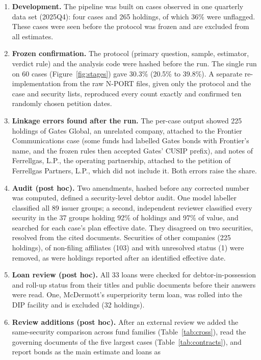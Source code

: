 \documentclass[11pt]{article}
\begin{document}
\begin{enumerate}
\item \textbf{Development.} The pipeline was built on cases observed in one quarterly data set (2025Q4):
four cases and 265 holdings, of which 36\% were unflagged. These cases were seen before the protocol was
frozen and are excluded from all estimates.
\item \textbf{Frozen confirmation.} The protocol (primary question, sample, estimator, verdict rule) and
the analysis code were hashed before the run. The single run on 60 cases (Figure~\ref{fig:stages}) gave 30.3\% (20.5\% to
39.8\%). A separate re-implementation from the raw N-PORT files, given only the protocol and the case and
security lists, reproduced every count exactly and confirmed ten randomly chosen petition dates.
\item \textbf{Linkage errors found after the run.} The per-case output showed 225 holdings of Gates
Global, an unrelated company, attached to the Frontier Communications case (some funds had labelled
Gates bonds with Frontier's name, and the frozen rules then accepted Gates' CUSIP prefix), and notes of
Ferrellgas, L.P., the operating partnership, attached to the petition of Ferrellgas Partners, L.P., which
did not include it. Both errors raise the share.
\item \textbf{Audit (post hoc).} Two amendments, hashed before any corrected number was computed, defined
a security-level debtor audit. One model labeller classified all 89 issuer groups; a second, independent
reviewer classified every security in the 37 groups holding 92\% of holdings and 97\% of value, and
searched for each case's plan effective date. They disagreed on two securities, resolved from the cited
documents. Securities of other companies (225 holdings), of non-filing affiliates (103) and with
unresolved status (1) were removed, as were holdings reported after an identified effective date.
\item \textbf{Loan review (post hoc).} All 33 loans were checked for debtor-in-possession and roll-up
status from their titles and public documents before their answers were read. One, McDermott's
superpriority term loan, was rolled into the DIP facility and is excluded (32 holdings).
\item \textbf{Review additions (post hoc).} After an external review we added the same-security
comparison across fund families (Table~\ref{tab:cross}), read the governing documents of the five
largest cases (Table~\ref{tab:contracts}), and report bonds as the main estimate and loans as

\end{enumerate}
\end{document}
